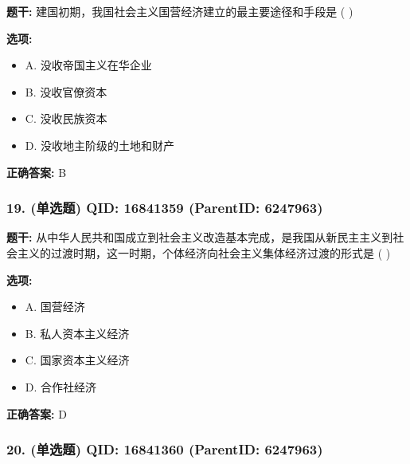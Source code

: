 \documentclass[12pt,UTF8]{ctexart}
\begin{document}
\textbf{题干:}
建国初期，我国社会主义国营经济建立的最主要途径和手段是 ( )



\textbf{选项:}
\begin{itemize}[leftmargin=*]

  \item A. 没收帝国主义在华企业

  \item B. 没收官僚资本

  \item C. 没收民族资本

  \item D. 没收地主阶级的土地和财产

\end{itemize}

\textbf{正确答案:}
B

\vspace{0.3em}\hrulefill\vspace{0.7em}

\subsubsection*{19. (单选题) \small QID: 16841359 (ParentID: 6247963)}

\textbf{题干:}
从中华人民共和国成立到社会主义改造基本完成，是我国从新民主主义到社会主义的过渡时期，这一时期，个体经济向社会主义集体经济过渡的形式是 ( )



\textbf{选项:}
\begin{itemize}[leftmargin=*]

  \item A. 国营经济

  \item B. 私人资本主义经济

  \item C. 国家资本主义经济

  \item D. 合作社经济

\end{itemize}

\textbf{正确答案:}
D

\vspace{0.3em}\hrulefill\vspace{0.7em}

\subsubsection*{20. (单选题) \small QID: 16841360 (ParentID: 6247963)}
\end{document}
